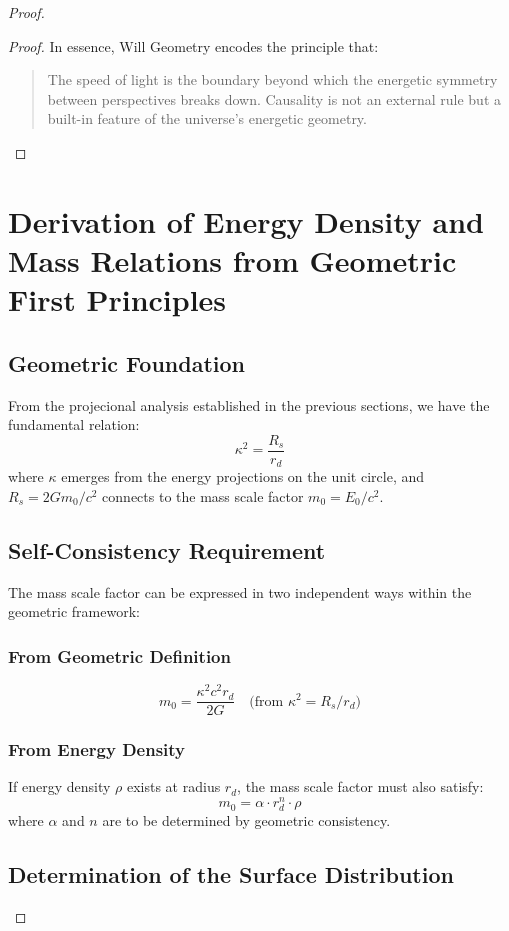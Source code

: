 \documentclass{article}
\begin{document}
\begin{proof}
\begin{proof}
In essence, Will Geometry encodes the principle that:
\begin{quote}
The speed of light is the boundary beyond which the energetic symmetry between perspectives breaks down. Causality is not an external rule but a built-in feature of the universe's energetic geometry.
\end{quote}
\end{proof}
\section{Derivation of Energy Density and Mass Relations from Geometric First Principles}

\subsection{Geometric Foundation}
From the projecional analysis established in the previous sections, we have the fundamental relation:
\[
\kappa^2 = \frac{R_s}{r_{d}}
\]
where $\kappa$ emerges from the energy projections on the unit circle, and $R_s = 2Gm_0/c^2$ connects to the mass scale factor $m_0 = E_0/c^2$.

\subsection{Self-Consistency Requirement}
The mass scale factor can be expressed in two independent ways within the geometric framework:

\subsubsection{From Geometric Definition}
\begin{equation}
m_0 = \frac{\kappa^2 c^2 r_{d}}{2G} \quad \text{(from } \kappa^2 = R_s/r_{d}\text{)}
\label{eq:mass_geometric}
\end{equation}
\subsubsection{From Energy Density}
If energy density $\rho$ exists at radius $r_{d}$, the mass scale factor must also satisfy:
\begin{equation}
m_0 = \alpha \cdot r_{d}^n \cdot \rho
\label{eq:mass_density}
\end{equation}
where $\alpha$ and $n$ are to be determined by geometric consistency.

\subsection{Determination of the Surface Distribution}


\end{proof}
\end{document}
